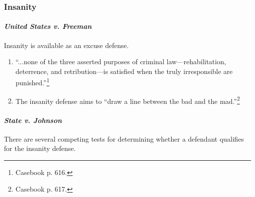 \subsubsection{Insanity}

\paragraph{\emph{United States v. Freeman}}

Insanity is available as an excuse defense.

\begin{enumerate}
    \item ``...none of the three asserted purposes of criminal 
    law---rehabilitation, deterrence, and retribution---is satisfied when the 
    truly irresponsible are punished.''\footnote{Casebook p. 616.}
    \item The insanity defense aims to ``draw a line between the bad and the 
    mad.''\footnote{Casebook p. 617.}
\end{enumerate}

\paragraph{\emph{State v. Johnson}}

There are several competing tests for determining whether a defendant 
qualifies for the insanity defense.


